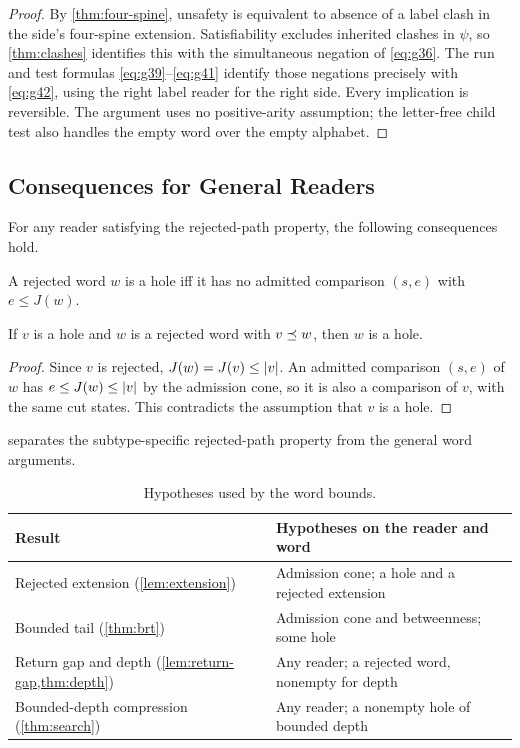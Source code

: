 \begin{proof} By \cref{thm:four-spine}, unsafety is equivalent to absence
of a label clash in the side's four-spine extension. Satisfiability excludes
inherited clashes in $\psi$, so \cref{thm:clashes} identifies
this with the simultaneous negation of \eqref{eq:g36}.
The run and test formulas \eqref{eq:g39}--\eqref{eq:g41} identify those negations precisely
with \eqref{eq:g42}, using the right label reader for the right side. Every implication is reversible. The argument uses
no positive-arity assumption; the letter-free child test also handles the
empty word over the empty alphabet. \end{proof}

\subsection{Consequences for General Readers}
For any reader satisfying the rejected-path property, the following consequences hold.

\begin{corollary}\label{cor:normal}
A rejected word $w$ is a hole iff it has no admitted comparison $(s,e)$ with $e \le J(w)$.
\end{corollary}

\begin{lemma}\label{lem:extension}
If $v$ is a hole and $w$ is a rejected word with $v \preceq w$, then $w$ is a hole.
\end{lemma}

\begin{proof}
Since $v$ is rejected, $J(w) = J(v) \le \lvert v\rvert$. An admitted comparison $(s,e)$ of $w$ has
$e \le J(w) \le \lvert v\rvert$ by the admission cone, so it is also a comparison of $v$, with the
same cut states. This contradicts the assumption that $v$ is a hole.
\end{proof}

 separates the subtype-specific rejected-path property
from the general word arguments.
\begin{table}[tbp]
\caption{Hypotheses used by the word bounds.}
\label{tab:reader-hypotheses}
\centering
\begin{tabular}{@{}p{.44\linewidth}p{.51\linewidth}@{}}
\toprule
Result & Hypotheses on the reader and word\\
\midrule
Rejected extension (\cref{lem:extension}) & Admission cone; a hole and a rejected extension\\
Bounded tail (\cref{thm:brt}) & Admission cone and betweenness; some hole\\
Return gap and depth (\cref{lem:return-gap,thm:depth}) & Any reader; a rejected word, nonempty for depth\\
Bounded-depth compression (\cref{thm:search}) & Any reader; a nonempty hole of bounded depth\\
\bottomrule
\end{tabular}
\end{table}

